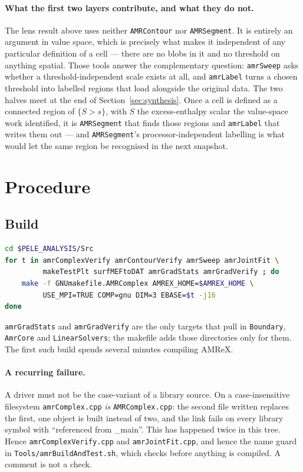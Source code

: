 \documentclass[11pt]{article}
\begin{document}
\paragraph{What the first two layers contribute, and what they do not.} The
lens result above uses neither \texttt{AMRContour} nor \texttt{AMRSegment}. It
is entirely an argument in value space, which is precisely what makes it
independent of any particular definition of a cell --- there are no blobs in it
and no threshold on anything spatial. Those tools answer the complementary
question: \texttt{amrSweep} asks whether a threshold-independent scale exists at
all, and \texttt{amrLabel} turns a chosen threshold into labelled regions that
load alongside the original data. The two halves meet at the end of
Section~\ref{sec:synthesis}. Once a cell is defined as a connected region of
$\{S > s\}$, with $S$ the excess-enthalpy scalar the value-space work
identified, it is \texttt{AMRSegment} that finds those regions and
\texttt{amrLabel} that writes them out --- and \texttt{AMRSegment}'s
processor-independent labelling is what would let the same region be
recognised in the next snapshot.

\section{Procedure}
\label{sec:procedure}

\subsection{Build}

\begin{lstlisting}[language=bash]
cd $PELE_ANALYSIS/Src
for t in amrComplexVerify amrContourVerify amrSweep amrJointFit \
         makeTestPlt surfMEFtoDAT amrGradStats amrGradVerify ; do
    make -f GNUmakefile.AMRComplex AMREX_HOME=$AMREX_HOME \
         USE_MPI=TRUE COMP=gnu DIM=3 EBASE=$t -j16
done
\end{lstlisting}

\texttt{amrGradStats} and \texttt{amrGradVerify} are the only targets that
pull in \texttt{Boundary}, \texttt{AmrCore} and \texttt{LinearSolvers}; the
makefile adds those directories only for them. The first such build spends
several minutes compiling AMReX.

\paragraph{A recurring failure.} A driver must not be the case-variant of a
library source. On a case-insensitive filesystem \texttt{amrComplex.cpp}
\emph{is} \texttt{AMRComplex.cpp}: the second file written replaces the first,
one object is built instead of two, and the link fails on every library symbol
with ``referenced from \_main''. This has happened twice in this tree. Hence
\texttt{amrComplexVerify.cpp} and \texttt{amrJointFit.cpp}, and hence the name
guard in \texttt{Tools/amrBuildAndTest.sh}, which checks before anything is
compiled. A comment is not a check.
\end{document}
